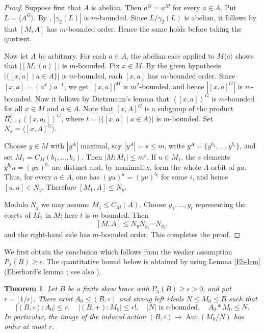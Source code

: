 \documentclass[11pt, oneside]{amsart}
\numberwithin{equation}{section}
\theoremstyle{plain}
\newtheorem{thm}[equation]{Theorem}
\theoremstyle{definition}
\newcommand{\gen}[1]{\left < #1 \right >}
\newcommand{\Aut}{\operatorname{Aut} }
\begin{document}
\begin{proof}
Suppose first that $A$ is abelian. Then $a^G=a^M$ for every $a\in A$.
Put $L=\langle A^G\rangle$. By \cite[Theorem 2.4]{DS22}, $|\gamma_2(L)|$ is
$m$-bounded. Since $L/\gamma_2(L)$ is abelian,  it follows by
\cite[Lemma 2.2]{DS22} that  $[M,A]$ has $m$-bounded order. Hence
the same holds before taking the quotient.

Now let $A$ be arbitrary. For each $a\in A$, the abelian case applied
to $M\langle a\rangle$ shows that $|[M,\gen{a}]|$ is $m$-bounded. Fix
$x\in M$. By the given hypothesis $|\{[x, a] \mid a \in A\}|$ is  $m$-bounded, each $[x,a]$ has $m$-bounded order. Since $[x,a]=(a^x)a^{-1}$, we get $|[x, a]|^M$ is $m^2$-bounded, and hence $|[x, a]^G|$ is $m$-bounded.   
Now it follows by Dietzmann's
lemma that $\gen{[x, a]}^G$ is $m$-bounded for all $x \in M$ and $a \in A$. Note that $[x, A]^G$ is a subgroup of the product $\Pi_{i=1}^{t} \gen{[x,a_i]}^G$, where $t = |\{[x, a] \mid a \in A\}|$ is $m$-bounded. Set 
$N_x=\langle[x,A]^G\rangle$. 


Choose $y\in M$ with $|y^A|$ maximal, say $|y^A|=s\leqslant m$, write
$y^A=\{y^{b_1},\ldots,y^{b_s}\}$, and set
$M_1=C_M(b_1,\ldots,b_s)$. Then $|M:M_1|\leqslant m^s$. If
$u\in M_1$, the $s$ elements $y^{b_i}u=(yu)^{b_i}$ are distinct and,
by maximality, form the whole $A$-orbit of $yu$. Thus, for every
$a\in A$, one has $(yu)^a=(yu)^{b_i}$ for some $i$, and hence
$[u,a]\in N_y$. Therefore $[M_1,A]\leqslant N_y$.

Modulo $N_y$ we may assume $M_1\leqslant C_M(A)$. Choose
$y_1,\ldots,y_t$ representing the cosets of $M_1$ in $M$; here $t$ is
$m$-bounded. Then
$$
[M,A]\leqslant N_yN_{y_1}\cdots N_{y_t},
$$
and the right-hand side has $m$-bounded order. This completes the proof.
\end{proof}

We first obtain the conclusion which follows from the weaker assumption
$P_\lambda(B)\geqslant\epsilon$. The quantitative bound below is obtained
by using Lemma \ref{Eb-lem} (Eberhard's lemma \cite[Lemma 2.1]{SE15}; see also
\cite[Lemma 2.5]{DS22}).

\begin{thm}\label{thm:Plambda-optimal-form}
Let $B$ be a finite skew brace with $P_\lambda(B)\geqslant\epsilon>0$,
and put $r=\lfloor1/\epsilon\rfloor$. There exist
$A_0\unlhd(B,\circ)$ and strong left ideals $N\leqslant M_0\leqslant B$
such that
$$
|(B,\circ):A_0|\leqslant r,\quad
|(B,+):M_0|\leqslant r!,\quad
|N|\text{ is $\epsilon$-bounded},\quad
A_0*M_0\leqslant N.
$$
In particular, the image of the induced action
$(B,\circ)\to\Aut(M_0/N)$ has order at most $r$.
\end{thm}
\end{document}
